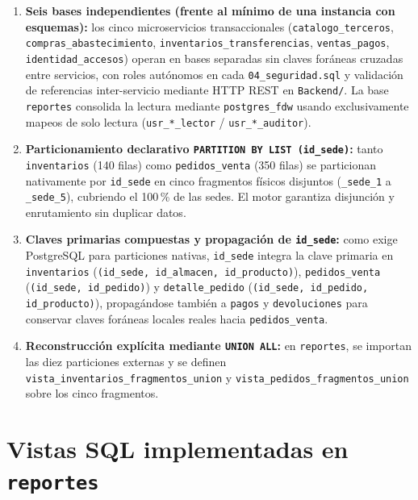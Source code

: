 \documentclass[11pt,oneside]{article}
\begin{document}
\begin{enumerate}[leftmargin=1.5em, itemsep=3.5pt]
  \item \textbf{Seis bases independientes (frente al m\'inimo de una instancia
        con esquemas):} los cinco microservicios transaccionales
        (\texttt{catalogo\_terceros}, \texttt{compras\_abastecimiento},
        \texttt{inventarios\_transferencias}, \texttt{ventas\_pagos},
        \texttt{identidad\_accesos}) operan en bases separadas sin claves
        for\'aneas cruzadas entre servicios, con roles aut\'onomos en cada
        \texttt{04\_seguridad.sql} y validaci\'on de referencias inter-servicio
        mediante HTTP REST en \texttt{Backend/}. La base \texttt{reportes}
        consolida la lectura mediante \texttt{postgres\_fdw} usando
        exclusivamente mapeos de solo lectura (\texttt{usr\_*\_lector} /
        \texttt{usr\_*\_auditor}).
  \item \textbf{Particionamiento declarativo \texttt{PARTITION BY LIST (id\_sede)}:}
        tanto \texttt{inventarios} (140 filas) como \texttt{pedidos\_venta} (350
        filas) se particionan nativamente por \texttt{id\_sede} en cinco
        fragmentos f\'isicos disjuntos (\texttt{\_sede\_1} a \texttt{\_sede\_5}),
        cubriendo el 100\,\% de las sedes. El motor garantiza disjun\-ci\'on
        y enrutamiento sin duplicar datos.
  \item \textbf{Claves primarias compuestas y propagaci\'on de \texttt{id\_sede}:}
        como exige PostgreSQL para particiones nativas, \texttt{id\_sede} integra
        la clave primaria en \texttt{inventarios} (\texttt{(id\_sede, id\_almacen,
        id\_producto)}), \texttt{pedidos\_venta} (\texttt{(id\_sede, id\_pedido)})
        y \texttt{detalle\_pedido} (\texttt{(id\_sede, id\_pedido, id\_producto)}),
        propag\'andose tambi\'en a \texttt{pagos} y \texttt{devoluciones} para
        conservar claves for\'aneas locales reales hacia \texttt{pedidos\_venta}.
  \item \textbf{Reconstrucci\'on expl\'icita mediante \texttt{UNION ALL}:} en
        \texttt{reportes}, se importan las diez particiones externas y se definen
        \texttt{vista\_inventarios\_fragmentos\_union} y
        \texttt{vista\_pedidos\_fragmentos\_union} sobre los cinco fragmentos.
\end{enumerate}

\section{Vistas SQL implementadas en \texttt{reportes}}
\end{document}
